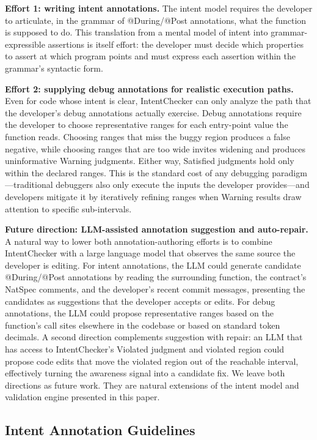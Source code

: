 \documentclass[pdflatex,sn-basic]{sn-jnl}%
\theoremstyle{thmstyleone}%
\theoremstyle{thmstyletwo}%
\theoremstyle{thmstylethree}%
\begin{document}
\smallskip
\noindent\textbf{Effort 1: writing intent annotations.}
The intent model requires the developer to articulate, in the grammar of @During/@Post annotations, what the function is supposed to do. This translation from a mental model of intent into grammar-expressible assertions is itself effort: the developer must decide which properties to assert at which program points and must express each assertion within the grammar's syntactic form.

\smallskip
\noindent\textbf{Effort 2: supplying debug annotations for realistic execution paths.}
Even for code whose intent is clear, IntentChecker can only analyze the path that the developer's debug annotations actually exercise.
Debug annotations require the developer to choose representative ranges for each entry-point value the function reads. Choosing ranges that miss the buggy region produces a false negative, while choosing ranges that are too wide invites widening and produces uninformative Warning judgments. Either way, Satisfied judgments hold only within the declared ranges.
This is the standard cost of any debugging paradigm---traditional debuggers also only execute the inputs the developer provides---and developers mitigate it by iteratively refining ranges when Warning results draw attention to specific sub-intervals.

\smallskip
\noindent\textbf{Future direction: LLM-assisted annotation suggestion and auto-repair.}
A natural way to lower both annotation-authoring efforts is to combine IntentChecker with a large language model that observes the same source the developer is editing.
For intent annotations, the LLM could generate candidate @During/@Post annotations by reading the surrounding function, the contract's NatSpec comments, and the developer's recent commit messages, presenting the candidates as suggestions that the developer accepts or edits.
For debug annotations, the LLM could propose representative ranges based on the function's call sites elsewhere in the codebase or based on standard token decimals.
A second direction complements suggestion with repair: an LLM that has access to IntentChecker's Violated judgment and violated region could propose code edits that move the violated region out of the reachable interval, effectively turning the awareness signal into a candidate fix.
We leave both directions as future work. They are natural extensions of the intent model and validation engine presented in this paper.

\subsection{Intent Annotation Guidelines}\label{sec:disc:guidelines}
\end{document}
